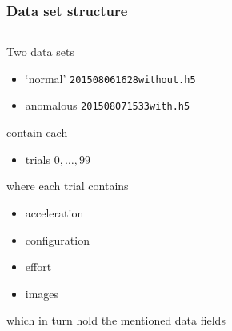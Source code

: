 \documentclass{beamer}
\begin{document}
    \begin{frame}
    	\frametitle{Data set structure}
        \begin{columns}[onlytextwidth]
            \begin{column}{.7\textwidth}
                Two data sets
                \begin{itemize}
                    \item `normal' \texttt{201508061628without.h5}
                    \item anomalous \texttt{201508071533with.h5}
                \end{itemize}
                contain each
                \begin{itemize}
                    \item trials $0, \ldots, 99$
                \end{itemize}
                where each trial contains
                \begin{itemize}
                    \item acceleration
                    \item configuration
                    \item effort
                    \item images
                \end{itemize}
                which in turn hold the mentioned data fields
            \end{column}
            \begin{column}{.3\textwidth}
                \begin{figure}
                    \centering

\end{figure}
\end{column}
\end{columns}
\end{frame}
\end{document}
